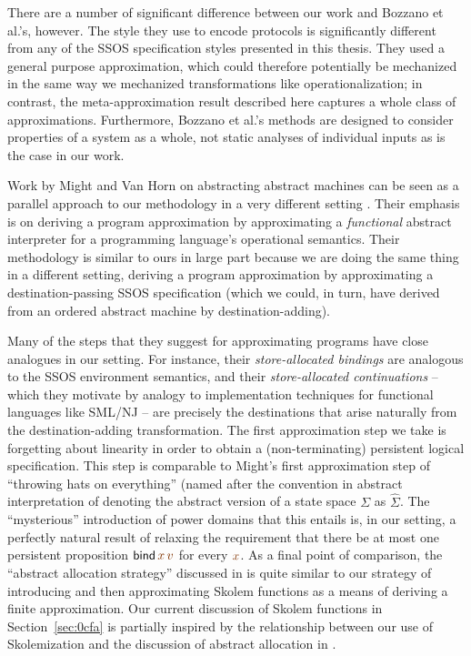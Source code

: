 There are a number of significant difference between our work and
Bozzano et al.'s, however. The style they use to encode protocols is
significantly different from any of the SSOS specification styles
presented in this thesis. They used a general purpose approximation,
which could therefore potentially be mechanized in the same way we
mechanized transformations like operationalization; in contrast, the
meta-approximation result described here captures a whole class of
approximations. Furthermore, Bozzano et al.'s methods are designed to
consider properties of a system as a whole, not static analyses of
individual inputs as is the case in our work.

Work by Might and Van Horn on abstracting abstract machines can be
seen as a parallel approach to our methodology in a very different
setting
\cite{might10resolving,might10abstract,might10abstracting}. Their
emphasis is on deriving a program approximation by approximating a
{\it functional} abstract interpreter for a programming language's
operational semantics. Their methodology is similar to ours in large
part because we are doing the same thing in a different setting,
deriving a program approximation by approximating a
destination-passing SSOS specification (which we could, in turn, have
derived from an ordered abstract machine by destination-adding).

Many of the steps that they suggest for approximating programs have
close analogues in our setting. For instance, their {\it
  store-allocated bindings} are analogous to the SSOS environment
semantics, and their {\it store-allocated continuations} -- which they
motivate by analogy to implementation techniques for functional
languages like SML/NJ -- are precisely the destinations that arise
naturally from the destination-adding transformation. The first
approximation step we take is forgetting about linearity in order to
obtain a (non-terminating) persistent logical specification. This step
is comparable to Might's first approximation step of ``throwing hats
on everything'' (named after the convention in abstract interpretation
of denoting the abstract version of a state space $\Sigma$ as
$\hat{\Sigma}$. The ``mysterious'' introduction of power domains that
this entails is, in our setting, a perfectly natural result of
relaxing the requirement that there be at most one persistent
proposition ${\sf bind}\,\lf{x}\,\lf{v}$ for every $\lf{x}$. 
As a final point of
comparison, the ``abstract allocation strategy'' discussed in
\cite{might10abstracting} is quite similar to our strategy of
introducing and then approximating Skolem functions as a means of
deriving a finite approximation. Our current discussion of Skolem
functions in Section~\ref{sec:0cfa} is partially inspired by the
relationship between our use of Skolemization and the discussion of
abstract allocation in \cite{might10abstracting}.

